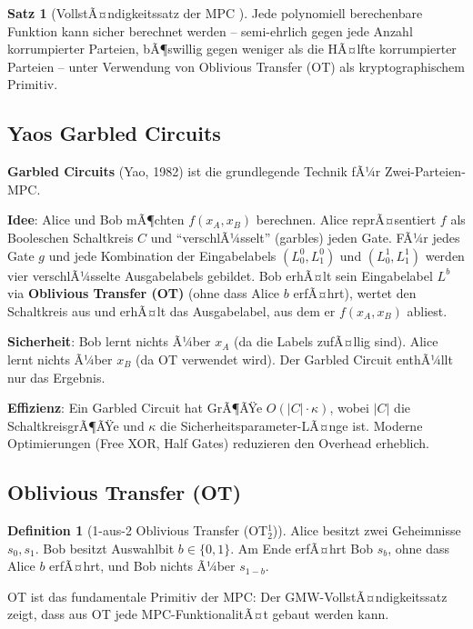 ﻿\documentclass[a4paper,12pt]{scrreprt}
\theoremstyle{definition}
\newtheorem{definition}{Definition}[section]
\newtheorem{satz}{Satz}[section]
\begin{document}
\begin{satz}[VollstÃ¤ndigkeitssatz der MPC \cite{GMW87}]
Jede polynomiell berechenbare Funktion kann sicher berechnet werden -- semi-ehrlich gegen jede Anzahl korrumpierter Parteien, bÃ¶swillig gegen weniger als die HÃ¤lfte korrumpierter Parteien -- unter Verwendung von Oblivious Transfer (OT) als kryptographischem Primitiv.
\end{satz}

\subsection{Yaos Garbled Circuits}

\textbf{Garbled Circuits} (Yao, 1982) \cite{Yao82} ist die grundlegende Technik fÃ¼r Zwei-Parteien-MPC.

\textbf{Idee}: Alice und Bob mÃ¶chten $f(x_A, x_B)$ berechnen. Alice reprÃ¤sentiert $f$ als Booleschen Schaltkreis $C$ und ``verschlÃ¼sselt'' (garbles) jeden Gate. FÃ¼r jedes Gate $g$ und jede Kombination der Eingabelabels $(L_0^0, L_1^0)$ und $(L_0^1, L_1^1)$ werden vier verschlÃ¼sselte Ausgabelabels gebildet. Bob erhÃ¤lt sein Eingabelabel $L^b$ via \textbf{Oblivious Transfer (OT)} (ohne dass Alice $b$ erfÃ¤hrt), wertet den Schaltkreis aus und erhÃ¤lt das Ausgabelabel, aus dem er $f(x_A, x_B)$ abliest.

\textbf{Sicherheit}: Bob lernt nichts Ã¼ber $x_A$ (da die Labels zufÃ¤llig sind). Alice lernt nichts Ã¼ber $x_B$ (da OT verwendet wird). Der Garbled Circuit enthÃ¼llt nur das Ergebnis.

\textbf{Effizienz}: Ein Garbled Circuit hat GrÃ¶ÃŸe $O(|C| \cdot \kappa)$, wobei $|C|$ die SchaltkreisgrÃ¶ÃŸe und $\kappa$ die Sicherheitsparameter-LÃ¤nge ist. Moderne Optimierungen (Free XOR, Half Gates) reduzieren den Overhead erheblich.

\subsection{Oblivious Transfer (OT)}

\begin{definition}[1-aus-2 Oblivious Transfer (OT$^1_2$)]
Alice besitzt zwei Geheimnisse $s_0, s_1$. Bob besitzt Auswahlbit $b \in \{0,1\}$. Am Ende erfÃ¤hrt Bob $s_b$, ohne dass Alice $b$ erfÃ¤hrt, und Bob nichts Ã¼ber $s_{1-b}$.
\end{definition}

OT ist das fundamentale Primitiv der MPC: Der GMW-VollstÃ¤ndigkeitssatz \cite{GMW87} zeigt, dass aus OT jede MPC-FunktionalitÃ¤t gebaut werden kann.
\end{document}
